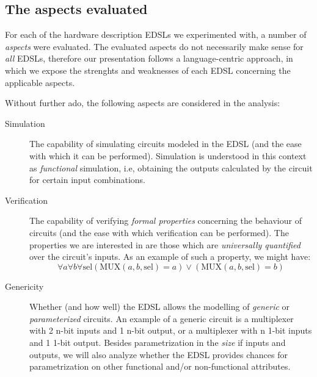 \documentclass[a4paper]{article}
\begin{document}
        \subsection{The aspects evaluated}
        \label{subsec:aspects}
            For each of the hardware description EDSLs we experimented with, a number of
            \emph{aspects} were evaluated. The evaluated aspects do not necessarily make sense for
            \emph{all} EDSLs, therefore our presentation follows a language-centric approach, in
            which we expose the strenghts and weaknesses of each EDSL concerning the applicable
            aspects.

            Without further ado, the following aspects are considered in the analysis:

            \begin{description}
                \item[Simulation]
                    The capability of simulating circuits modeled in the EDSL (and the ease with
                    which it can be performed). Simulation is understood in this context as
                    \emph{functional} simulation, i.e, obtaining the outputs calculated by the
                    circuit for certain input combinations.

                \item[Verification]
                    The capability of verifying \emph{formal properties} concerning the behaviour of
                    circuits (and the ease with which verification can be performed). The properties
                    we are interested in are those which are \emph{universally quantified} over the
                    circuit's inputs. As an example of such a property, we might have:
                    \[
                        \forall a \forall b \forall \text{sel}
                            \left( \text{MUX}(a,b,\text{sel}) = a \right)
                            \vee
                            \left( \text{MUX}(a,b,\text{sel}) = b \right)
                    \]

                \item[Genericity]
                    Whether (and how well) the EDSL allows the modelling of \emph{generic} or
                    \emph{parameterized} circuits. An example of a generic circuit is a multiplexer
                    with 2 n-bit inputs and 1 n-bit output, or a multiplexer with n 1-bit inputs and
                    1 1-bit output. Besides parametrization in the \emph{size} if inputs and
                    outputs, we will also analyze whether the EDSL provides chances for
                    parametrization on other functional and/or non-functional attributes.


\end{description}
\end{document}
